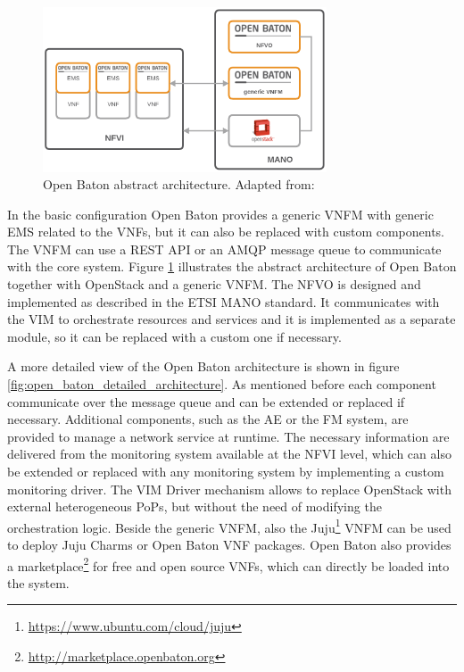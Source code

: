\begin{figure}[H]
    \centering
    \includegraphics[width=0.75\textwidth]{resources/images/open_baton_simple_architecture.png}
    \caption[Open Baton abstract architecture]{Open Baton abstract architecture. Adapted from: \autocite{openBatonDoc}}
    \label{fig:open_baton_abstract_architecture}
\end{figure}

In the basic configuration Open Baton provides a generic \ac{VNFM} with generic \ac{EMS} related to the \acp{VNF}, but it can also be replaced with custom components.
The \ac{VNFM} can use a \ac{REST} \ac{API} or an \ac{AMQP} message queue to communicate with the core system.
Figure \ref{fig:open_baton_abstract_architecture} illustrates the abstract architecture of Open Baton together with OpenStack and a generic \ac{VNFM}.
The \ac{NFVO} is designed and implemented as described in the \ac{ETSI} \ac{MANO} standard.\autocite{openBatonDoc}
It communicates with the \ac{VIM} to orchestrate resources and services and it is implemented as a separate module, so it can be replaced with a custom one if necessary.

A more detailed view of the Open Baton architecture is shown in figure \ref{fig:open_baton_detailed_architecture}.
As mentioned before each component communicate over the message queue and can be extended or replaced if necessary.
Additional components, such as the \ac{AE} or the \ac{FM} system, are provided to manage a network service at runtime.\autocite{openBatonDoc}
The necessary information are delivered from the monitoring system available at the \ac{NFVI} level, which can also be extended or replaced with any monitoring system by implementing a custom monitoring driver.\autocite{openBatonDoc}
The \ac{VIM} Driver mechanism allows to replace OpenStack with external heterogeneous \acp{PoP}, but without the need of modifying the orchestration logic.\autocite{openBatonDoc}
Beside the generic \ac{VNFM}, also the Juju\footnote{\url{https://www.ubuntu.com/cloud/juju}} \ac{VNFM} can be used to deploy Juju Charms or Open Baton \ac{VNF} packages.
Open Baton also provides a marketplace\footnote{\url{http://marketplace.openbaton.org}} for free and open source \acp{VNF}, which can directly be loaded into the system.

